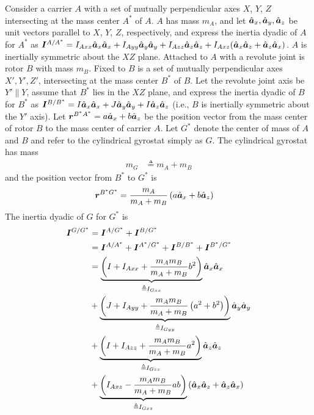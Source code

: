 Consider a carrier $A$ with a set of mutually perpendicular axes $X$, $Y$, $Z$
intersecting at the mass center $A^*$ of $A$. $A$ has mass $m_A$, and let
$\hat{\boldsymbol{a}}_{x}, \hat{\boldsymbol{a}}_{y}, \hat{\boldsymbol{a}}_{z}$ be unit vectors parallel to $X$, $Y$, $Z$,
respectively, and express the inertia dyadic of $A$ for $A^*$ as
$\boldsymbol{I}^{A/A^*} = I_{Axx}\hat{\boldsymbol{a}}_{x}\hat{\boldsymbol{a}}_{x} + I_{Ayy}\hat{\boldsymbol{a}}_{y}\hat{\boldsymbol{a}}_{y} +
I_{Azz}\hat{\boldsymbol{a}}_{z}\hat{\boldsymbol{a}}_{z} + I_{Axz}(\hat{\boldsymbol{a}}_{x}\hat{\boldsymbol{a}}_{z} + \hat{\boldsymbol{a}}_{z}\hat{\boldsymbol{a}}_{x})$.
$A$ is inertially symmetric about the $XZ$ plane. Attached to $A$ with a
revolute joint is rotor $B$ with mass $m_B$. Fixed to $B$ is a set of mutually
perpendicular axes $X', Y', Z'$, intersecting at the mass center $B^*$ of $B$.
Let the revolute joint axis be $Y'\parallel Y$, assume that $B^*$ lies in the
$XZ$ plane, and express the inertia dyadic of $B$ for $B^*$ as $\boldsymbol{I}^{B/B^*}
= I\hat{\boldsymbol{a}}_{x}\hat{\boldsymbol{a}}_{x} + J\hat{\boldsymbol{a}}_{y}\hat{\boldsymbol{a}}_{y} + I\hat{\boldsymbol{a}}_{z}\hat{\boldsymbol{a}}_{z}$ (i.e., $B$
is inertially symmetric about the $Y'$ axis).  Let $\boldsymbol{r}^{B^*A^*} = a
\hat{\boldsymbol{a}}_{x} + b \hat{\boldsymbol{a}}_{z}$ be the position vector from the mass center of rotor
$B$ to the mass center of carrier $A$. Let $G^*$ denote the center of mass of
$A$ and $B$ and refer to the cylindrical gyrostat simply as $G$. The
cylindrical gyrostat has mass
\begin{align}
  m_G &\triangleq m_A + m_B
\end{align}
and the position vector from $B^*$ to $G^*$ is
\begin{align}
  \boldsymbol{r}^{B^*G^*} &= \frac{m_A}{m_A + m_B}\left(a \hat{\boldsymbol{a}}_{x} + b \hat{\boldsymbol{a}}_{z}\right)
\end{align}
The inertia dyadic of $G$ for $G^*$ is
\begin{align}
  \bs{I}^{G/G^*} &= \bs{I}^{A/G^*} + \bs{I}^{B/G^*} \notag \\
                 &= \bs{I}^{A/A^*} + \bs{I}^{A^*/G^*} + \bs{I}^{B/B^*} +
                 \bs{I}^{B^*/G^*} \notag \\
%
                 &= \underbrace{\left(I + I_{Axx} + \frac{m_A m_B}{m_A + m_B}
               b^2 \right)}_{\triangleq I_{Gxx}}
                 \uv{a}{x}\uv{a}{x} \notag \\
%
                 &+ \underbrace{\left(J + I_{Ayy} + \frac{m_A m_B}{m_A + m_B} \left(a^2 +
               b^2\right)\right)}_{\triangleq I_{Gyy}} \uv{a}{y}\uv{a}{y} \notag \\
%
                 &+ \underbrace{\left(I + I_{Azz} + \frac{m_A m_B}{m_A + m_B}
               a^2 \right)}_{\triangleq I_{Gzz}}
                 \uv{a}{z}\uv{a}{z} \notag \\
%
                 &+ \underbrace{\left(I_{Axz} - \frac{m_A m_B}{m_A + m_B} a b
               \right)}_{\triangleq I_{Gxz}}
               \left(\uv{a}{x}\uv{a}{z} + \uv{a}{z}\uv{a}{x}\right)
\end{align}
